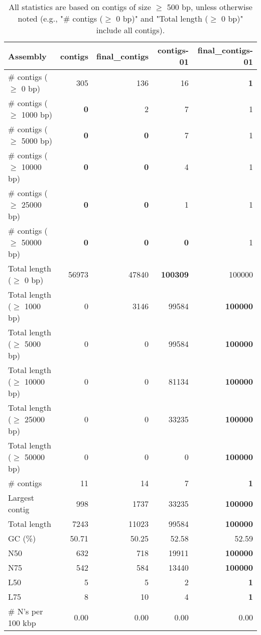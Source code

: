 \documentclass[12pt,a4paper]{article}
\begin{document}
\begin{table}[ht]
\begin{center}
\caption{All statistics are based on contigs of size $\geq$ 500 bp, unless otherwise noted (e.g., "\# contigs ($\geq$ 0 bp)" and "Total length ($\geq$ 0 bp)" include all contigs).}
\begin{tabular}{|l*{4}{|r}|}
\hline
Assembly & contigs & final\_contigs & contigs-01 & final\_contigs-01 \\ \hline
\# contigs ($\geq$ 0 bp) & 305 & 136 & 16 & {\bf 1} \\ \hline
\# contigs ($\geq$ 1000 bp) & {\bf 0} & 2 & 7 & 1 \\ \hline
\# contigs ($\geq$ 5000 bp) & {\bf 0} & {\bf 0} & 7 & 1 \\ \hline
\# contigs ($\geq$ 10000 bp) & {\bf 0} & {\bf 0} & 4 & 1 \\ \hline
\# contigs ($\geq$ 25000 bp) & {\bf 0} & {\bf 0} & 1 & 1 \\ \hline
\# contigs ($\geq$ 50000 bp) & {\bf 0} & {\bf 0} & {\bf 0} & 1 \\ \hline
Total length ($\geq$ 0 bp) & 56973 & 47840 & {\bf 100309} & 100000 \\ \hline
Total length ($\geq$ 1000 bp) & 0 & 3146 & 99584 & {\bf 100000} \\ \hline
Total length ($\geq$ 5000 bp) & 0 & 0 & 99584 & {\bf 100000} \\ \hline
Total length ($\geq$ 10000 bp) & 0 & 0 & 81134 & {\bf 100000} \\ \hline
Total length ($\geq$ 25000 bp) & 0 & 0 & 33235 & {\bf 100000} \\ \hline
Total length ($\geq$ 50000 bp) & 0 & 0 & 0 & {\bf 100000} \\ \hline
\# contigs & 11 & 14 & 7 & {\bf 1} \\ \hline
Largest contig & 998 & 1737 & 33235 & {\bf 100000} \\ \hline
Total length & 7243 & 11023 & 99584 & {\bf 100000} \\ \hline
GC (\%) & 50.71 & 50.25 & 52.58 & 52.59 \\ \hline
N50 & 632 & 718 & 19911 & {\bf 100000} \\ \hline
N75 & 542 & 584 & 13440 & {\bf 100000} \\ \hline
L50 & 5 & 5 & 2 & {\bf 1} \\ \hline
L75 & 8 & 10 & 4 & {\bf 1} \\ \hline
\# N's per 100 kbp & 0.00 & 0.00 & 0.00 & 0.00 \\ \hline
\end{tabular}
\end{center}
\end{table}
\end{document}
